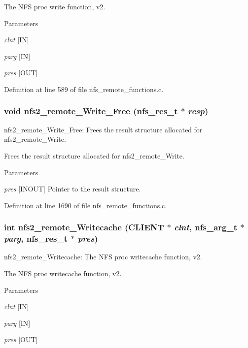 The NFS proc write function, v2.


\begin{DoxyParams}{Parameters}
\item[{\em clnt}][IN] \item[{\em parg}][IN] \item[{\em pres}][OUT] \end{DoxyParams}


Definition at line 589 of file nfs\_\-remote\_\-functions.c.
\subsubsection[{nfs2\_\-remote\_\-Write\_\-Free}]{\setlength{\rightskip}{0pt plus 5cm}void nfs2\_\-remote\_\-Write\_\-Free (nfs\_\-res\_\-t $\ast$ {\em resp})}\label{group__NFSprocs_ga5cbc34d26235e74b6ca5f867a48323dc}
nfs2\_\-remote\_\-Write\_\-Free: Frees the result structure allocated for nfs2\_\-remote\_\-Write.

Frees the result structure allocated for nfs2\_\-remote\_\-Write.


\begin{DoxyParams}{Parameters}
\item[{\em pres}][INOUT] Pointer to the result structure. \end{DoxyParams}


Definition at line 1690 of file nfs\_\-remote\_\-functions.c.
\subsubsection[{nfs2\_\-remote\_\-Writecache}]{\setlength{\rightskip}{0pt plus 5cm}int nfs2\_\-remote\_\-Writecache (CLIENT $\ast$ {\em clnt}, \/  nfs\_\-arg\_\-t $\ast$ {\em parg}, \/  nfs\_\-res\_\-t $\ast$ {\em pres})}\label{group__NFSprocs_gab226eed035dba6d1e2027b2bc082f9ef}
nfs2\_\-remote\_\-Writecache: The NFS proc writecache function, v2.

The NFS proc writecache function, v2.


\begin{DoxyParams}{Parameters}
\item[{\em clnt}][IN] \item[{\em parg}][IN] \item[{\em pres}][OUT] \end{DoxyParams}


